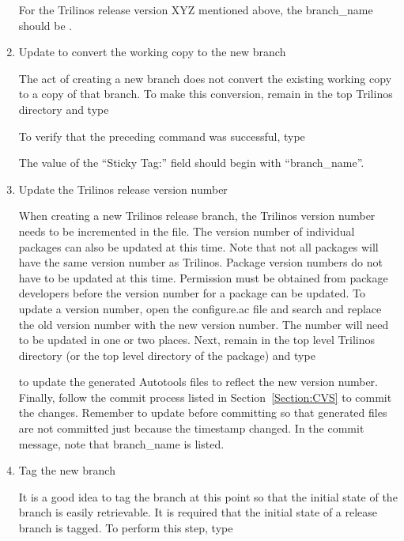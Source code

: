 \documentclass[12pt,relax]{TrilinosDevGuide}
\begin{document}
\begin{enumerate}
For the Trilinos release version XYZ mentioned above, the branch\_name 
should be .

\item Update to convert the working copy to the new branch

The act of creating a new branch does not convert the existing working copy to 
a copy of that branch.  To make this conversion, remain in the top Trilinos 
directory and type


To verify that the preceding command was successful, type 


The value of the ``Sticky Tag:'' field should begin with ``branch\_name''.

\item Update the Trilinos release version number

When creating a new Trilinos release branch, the Trilinos version number needs 
to be incremented in the  file.  The 
version number of individual packages can also be updated at this time.  Note 
that not all packages will have the same version number as Trilinos.  Package 
version numbers do not have to be updated at this time.  Permission must be 
obtained from package developers before the version number for a package can 
be updated.  To update a version number, open the configure.ac file and 
search and replace the old version number with the new 
version number.  The number will need to be updated in one or two places.  
Next, remain in the top level Trilinos directory (or the top level directory 
of the package) and type


to update the generated Autotools files to reflect the new version number.  
Finally, follow the commit process listed in Section~\ref{Section:CVS} to 
commit the changes.  Remember to update before committing so that generated 
files are not committed just because the timestamp changed.  In the commit 
message, note that branch\_name is listed.

\item Tag the new branch

It is a good idea to tag the branch at this point so that the initial state 
of the branch is easily retrievable.  It is required that the initial state of 
a release branch is tagged.  To perform this step, type


\end{enumerate}
\end{document}
